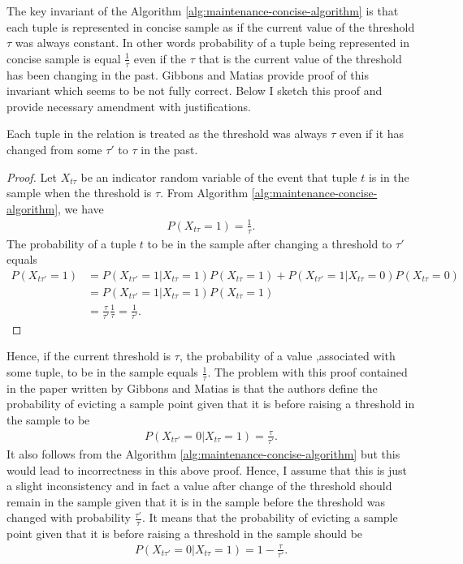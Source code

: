 The key invariant of the Algorithm
  \ref{alg:maintenance-concise-algorithm} is that each tuple is
represented in concise sample as if the current value of the threshold
$\tau$ was always constant. In other words probability of a tuple being
represented in concise sample is equal $\frac{1}{\tau}$ even if the
$\tau$ that is the current value of the threshold has been changing in
the past. Gibbons and Matias \cite{GM98} provide proof of this
invariant which seems to be not fully correct. Below I sketch this
proof and provide necessary amendment with justifications.
\begin{theorem}
Each tuple in the relation is treated as the threshold was always
$\tau$ even if it has changed from some $\tau'$ to $\tau$ in the past.
\end{theorem}
\begin{proof}
Let $X_{t\tau}$ be an indicator random variable of the event that tuple
$t$ is in the sample when the threshold is $\tau$. From Algorithm
\ref{alg:maintenance-concise-algorithm}, we have
\begin{align*}
P(X_{t\tau} = 1) = \frac{1}{\tau}.
\end{align*}
The probability of a tuple $t$ to be in the sample after changing a
threshold to $\tau'$ equals
\begin{align*}
  P(X_{t\tau'} = 1) &= P(X_{t\tau'} = 1 | X_{t\tau} = 1) P(X_{t\tau} = 1)
  + P(X_{t\tau'} = 1 | X_{t\tau} = 0) P(X_{t\tau} = 0) \\
  &=  P(X_{t\tau'} = 1 | X_{t\tau} = 1) P(X_{t\tau} = 1) \\
  &= \frac{\tau}{\tau'} \frac{1}{\tau} = \frac{1}{\tau'}.
\end{align*}
\end{proof}
Hence, if the current threshold is $\tau$, the probability of a value
,associated with some tuple, to be in the sample equals $\frac{1}{\tau}$. The problem
with this proof contained in the paper written by Gibbons and Matias
\cite{GM98} is that the authors define the
probability of evicting a sample point given that it is before raising
a threshold in the sample to be
\begin{align*}
P(X_{t\tau'} = 0 | X_{t\tau} = 1) = \frac{\tau}{\tau'}.
\end{align*}
It also follows from the
Algorithm \ref{alg:maintenance-concise-algorithm} but this would lead
to incorrectness in this above proof. Hence, I assume
that this is just a slight inconsistency and in fact a value after
change of the threshold should
remain in the sample given that it is in the sample before the
threshold was changed with probability $\frac{\tau'}{\tau}$. It means
that the probability of evicting a sample point given that it is before raising
a threshold in the sample should be
\begin{align*}
 P(X_{t\tau'} = 0 | X_{t\tau} = 1) = 1 - \frac{\tau}{\tau'}.
\end{align*}

